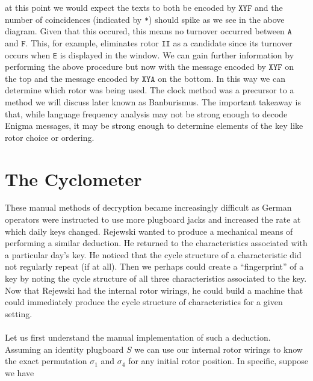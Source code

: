 at this point we would expect the texts to both be encoded by
$\texttt{XYF}$ and the number of coincidences (indicated by
\texttt{*}) should spike as we see in the above diagram. Given that
this occured, this means no turnover occurred between $\texttt{A}$ and
$\texttt{F}$. This, for example, eliminates rotor \texttt{II} as a
candidate since its turnover occurs when \texttt{E} is displayed in
the window. We can gain further information by performing the above
procedure but now with the message encoded by $\texttt{XYF}$ on the
top and the message encoded by $\texttt{XYA}$ on the bottom. In this
way we can determine which rotor was being used. The clock method was
a precursor to a method we will discuss later known as Banburismus.
The important takeaway is that, while language frequency analysis may not be
strong enough to decode Enigma messages, it may be strong enough to
determine elements of the key like rotor choice or ordering.

\section{The Cyclometer}\label{cyclometer}

These manual methods of decryption became increasingly difficult as
German operators were instructed to use more plugboard jacks and
increased the rate at which daily keys changed. Rejewski wanted to
produce a mechanical means of performing a similar deduction. He
returned to the characteristics associated with a particular day's
key. He noticed that the cycle structure of a characteristic did not
regularly repeat (if at all). Then we perhaps could create a
``fingerprint'' of a key by noting the cycle structure of all three
characteristics associated to the key. Now that Rejewski had the
internal rotor wirings, he could build a machine that could
immediately produce the cycle structure of characteristics for a given setting.
\\\\Let us first understand the manual implementation of such a
deduction. Assuming an identity plugboard $S$ we can use our internal
rotor wirings to know the exact permutation $\sigma_1$ and
$\sigma_4$ for any initial rotor position. In specific, suppose we have


